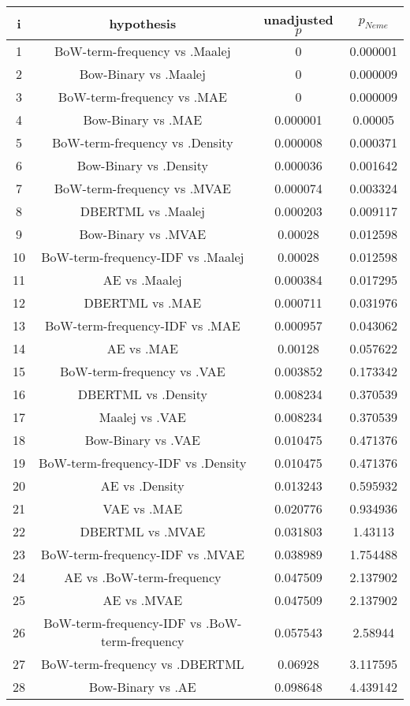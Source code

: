 \documentclass[a4paper,10pt]{article}
\begin{document}
\begin{landscape}
\begin{table}[!htp]
\centering\scriptsize
\begin{tabular}{cccc}
i&hypothesis&unadjusted $p$&$p_{Neme}$\\
\hline1&BoW-term-frequency vs .Maalej&0&0.000001\\
2&Bow-Binary vs .Maalej&0&0.000009\\
3&BoW-term-frequency vs .MAE&0&0.000009\\
4&Bow-Binary vs .MAE&0.000001&0.00005\\
5&BoW-term-frequency vs .Density&0.000008&0.000371\\
6&Bow-Binary vs .Density&0.000036&0.001642\\
7&BoW-term-frequency vs .MVAE&0.000074&0.003324\\
8&DBERTML vs .Maalej&0.000203&0.009117\\
9&Bow-Binary vs .MVAE&0.00028&0.012598\\
10&BoW-term-frequency-IDF vs .Maalej&0.00028&0.012598\\
11&AE vs .Maalej&0.000384&0.017295\\
12&DBERTML vs .MAE&0.000711&0.031976\\
13&BoW-term-frequency-IDF vs .MAE&0.000957&0.043062\\
14&AE vs .MAE&0.00128&0.057622\\
15&BoW-term-frequency vs .VAE&0.003852&0.173342\\
16&DBERTML vs .Density&0.008234&0.370539\\
17&Maalej vs .VAE&0.008234&0.370539\\
18&Bow-Binary vs .VAE&0.010475&0.471376\\
19&BoW-term-frequency-IDF vs .Density&0.010475&0.471376\\
20&AE vs .Density&0.013243&0.595932\\
21&VAE vs .MAE&0.020776&0.934936\\
22&DBERTML vs .MVAE&0.031803&1.43113\\
23&BoW-term-frequency-IDF vs .MVAE&0.038989&1.754488\\
24&AE vs .BoW-term-frequency&0.047509&2.137902\\
25&AE vs .MVAE&0.047509&2.137902\\
26&BoW-term-frequency-IDF vs .BoW-term-frequency&0.057543&2.58944\\
27&BoW-term-frequency vs .DBERTML&0.06928&3.117595\\
28&Bow-Binary vs .AE&0.098648&4.439142\\

\end{tabular}
\end{table}
\end{landscape}
\end{document}
